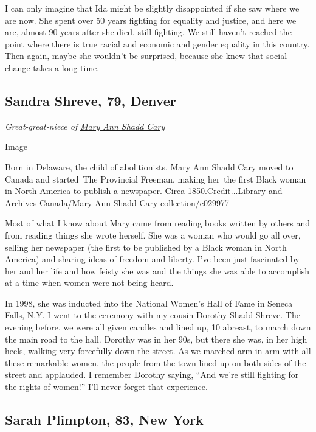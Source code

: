 I can only imagine that Ida might be slightly disappointed if she saw
where we are now. She spent over 50 years fighting for equality and
justice, and here we are, almost 90 years after she died, still
fighting. We still haven't reached the point where there is true racial
and economic and gender equality in this country. Then again, maybe she
wouldn't be surprised, because she knew that social change takes a long
time.

\hypertarget{sandra-shreve-79-denver}{%
\subsection{Sandra Shreve, 79, Denver}\label{sandra-shreve-79-denver}}

\emph{Great-great-niece of}
\href{https://www.nytimes3xbfgragh.onion/2018/06/06/obituaries/mary-ann-shadd-cary-abolitionist-overlooked.html}{\emph{Mary
Ann Shadd Cary}}

Image

Born in Delaware, the child of abolitionists, Mary Ann Shadd Cary moved
to Canada and started~The Provincial Freeman, making her~the first Black
woman in North America to publish a newspaper. Circa
1850.Credit...Library and Archives Canada/Mary Ann Shadd Cary
collection/c029977

Most of what I know about Mary came from reading books written by others
and from reading things she wrote herself. She was a woman who would go
all over, selling her newspaper (the first to be published by a Black
woman in North America) and sharing ideas of freedom and liberty. I've
been just fascinated by her and her life and how feisty she was and the
things she was able to accomplish at a time when women were not being
heard.

In 1998, she was inducted into the National Women's Hall of Fame in
Seneca Falls, N.Y. I went to the ceremony with my cousin Dorothy Shadd
Shreve. The evening before, we were all given candles and lined up, 10
abreast, to march down the main road to the hall. Dorothy was in her
90s, but there she was, in her high heels, walking very forcefully down
the street. As we marched arm-in-arm with all these remarkable women,
the people from the town lined up on both sides of the street and
applauded. I remember Dorothy saying, ``And we're still fighting for the
rights of women!'' I'll never forget that experience.

\hypertarget{sarah-plimpton-83-new-york}{%
\subsection{Sarah Plimpton, 83, New
York}\label{sarah-plimpton-83-new-york}}

